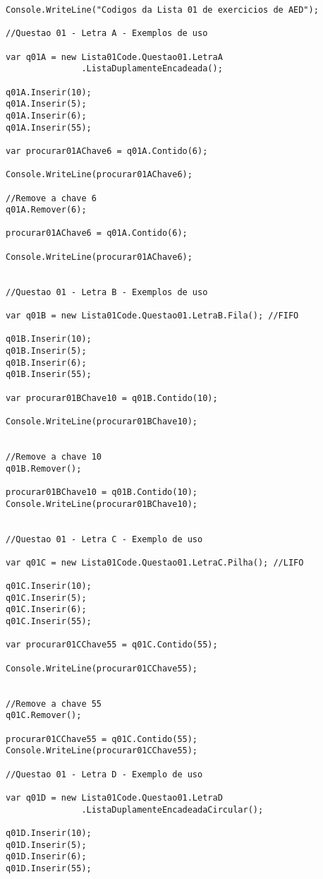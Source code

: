 \documentclass[portuguese,12pt,a4paper]{article}
\begin{document}
\lstset{language=C++,
	basicstyle=\footnotesize,	
	numbers=left,
	numberstyle=\footnotesize,
	frame=shadowbox}
\begin{lstlisting} 
Console.WriteLine("Codigos da Lista 01 de exercicios de AED");

//Questao 01 - Letra A - Exemplos de uso

var q01A = new Lista01Code.Questao01.LetraA
               .ListaDuplamenteEncadeada();

q01A.Inserir(10);
q01A.Inserir(5);
q01A.Inserir(6);
q01A.Inserir(55);

var procurar01AChave6 = q01A.Contido(6);

Console.WriteLine(procurar01AChave6);

//Remove a chave 6
q01A.Remover(6);

procurar01AChave6 = q01A.Contido(6);

Console.WriteLine(procurar01AChave6);


//Questao 01 - Letra B - Exemplos de uso

var q01B = new Lista01Code.Questao01.LetraB.Fila(); //FIFO

q01B.Inserir(10);
q01B.Inserir(5);
q01B.Inserir(6);
q01B.Inserir(55);

var procurar01BChave10 = q01B.Contido(10);

Console.WriteLine(procurar01BChave10);


//Remove a chave 10
q01B.Remover();

procurar01BChave10 = q01B.Contido(10);
Console.WriteLine(procurar01BChave10);


//Questao 01 - Letra C - Exemplo de uso

var q01C = new Lista01Code.Questao01.LetraC.Pilha(); //LIFO

q01C.Inserir(10);
q01C.Inserir(5);
q01C.Inserir(6);
q01C.Inserir(55);

var procurar01CChave55 = q01C.Contido(55);

Console.WriteLine(procurar01CChave55);


//Remove a chave 55
q01C.Remover();

procurar01CChave55 = q01C.Contido(55);
Console.WriteLine(procurar01CChave55);

//Questao 01 - Letra D - Exemplo de uso

var q01D = new Lista01Code.Questao01.LetraD
               .ListaDuplamenteEncadeadaCircular();

q01D.Inserir(10);
q01D.Inserir(5);
q01D.Inserir(6);
q01D.Inserir(55);


\end{lstlisting}
\end{document}
